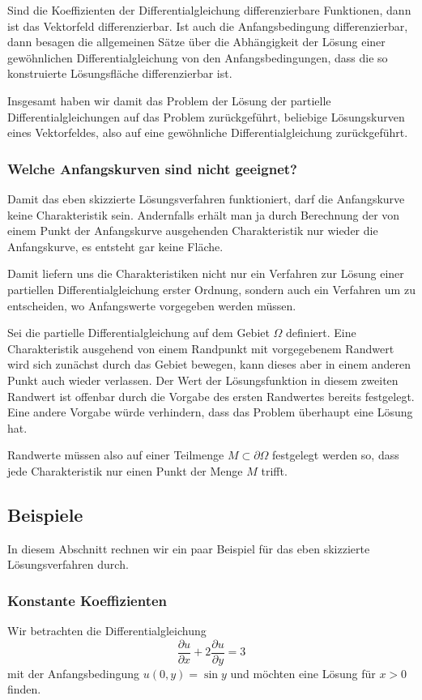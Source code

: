 Sind die Koeffizienten der Differentialgleichung differenzierbare Funktionen,
dann ist das Vektorfeld differenzierbar.
Ist auch die Anfangsbedingung differenzierbar,
dann besagen die allgemeinen Sätze über die Abhängigkeit der Lösung einer
gewöhnlichen Differentialgleichung von den Anfangsbedingungen, dass die so
konstruierte Lösungsfläche differenzierbar ist.

Insgesamt haben wir damit das Problem der Lösung der partielle Differentialgleichungen auf das Problem 
zurückgeführt, beliebige Lösungskurven eines Vektorfeldes, also auf
eine gewöhnliche Differentialgleichung zurückgeführt.


\subsubsection{Welche Anfangskurven sind nicht geeignet?}
Damit das eben skizzierte Lösungsverfahren funktioniert, 
darf die Anfangskurve keine Charakteristik sein.
Andernfalls erhält man ja durch Berechnung der von einem Punkt
der Anfangskurve ausgehenden Charakteristik nur wieder die
Anfangskurve, es entsteht gar keine Fläche.

Damit liefern uns die Charakteristiken nicht nur ein Verfahren
zur Lösung einer partiellen Differentialgleichung erster Ordnung,
sondern auch ein Verfahren um zu entscheiden, wo Anfangswerte
vorgegeben werden müssen.

Sei die partielle Differentialgleichung auf dem Gebiet $\Omega$
definiert.
Eine Charakteristik ausgehend von einem Randpunkt mit vorgegebenem
Randwert wird sich zunächst durch das Gebiet bewegen, kann dieses
aber in einem anderen Punkt auch wieder verlassen. Der Wert der
Lösungsfunktion in diesem zweiten Randwert ist offenbar durch die
Vorgabe des ersten Randwertes bereits festgelegt.
Eine andere Vorgabe würde verhindern, dass das Problem überhaupt
eine Lösung hat.

Randwerte müssen also auf einer Teilmenge $M\subset\partial \Omega$
festgelegt werden so, dass jede Charakteristik nur einen Punkt der
Menge $M$ trifft.

\subsection{Beispiele}
In diesem Abschnitt rechnen wir ein paar Beispiel für das eben
skizzierte Lösungsverfahren durch.
\subsubsection{Konstante Koeffizienten\label{konstantekoeff}}
Wir betrachten die Differentialgleichung
\[
\frac{\partial u}{\partial x}+2\frac{\partial u}{\partial y}=3
\]
mit der Anfangsbedingung $u(0,y)=\sin y$ und möchten eine Lösung für
$x>0$ finden.

